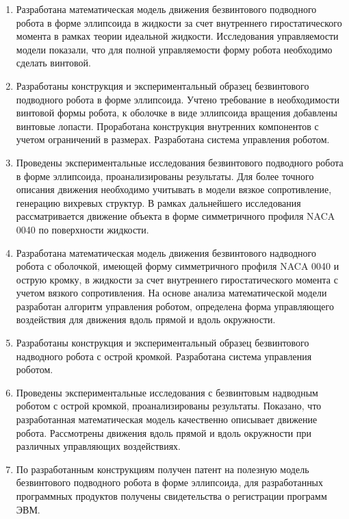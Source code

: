 \begin{enumerate}
  \item Разработана математическая модель движения безвинтового подводного робота в форме эллипсоида в жидкости за счет внутреннего гиростатического момента в рамках теории идеальной жидкости. Исследования управляемости модели показали, что для полной управляемости форму робота необходимо сделать винтовой.
  
  \item Разработаны конструкция и экспериментальный образец безвинтового подводного робота в форме эллипсоида. Учтено требование в необходимости винтовой формы робота, к оболочке в виде эллипсоида вращения добавлены винтовые лопасти. Проработана конструкция внутренних компонентов с учетом ограничений в размерах. Разработана система управления роботом.
  
  \item Проведены экспериментальные исследования безвинтового подводного робота в форме эллипсоида, проанализированы результаты. Для более точного описания движения необходимо учитывать в модели вязкое сопротивление, генерацию вихревых структур. В рамках дальнейшего исследования рассматривается движение объекта в форме симметричного профиля NACA 0040 по поверхности жидкости.
  
  \item Разработана математическая модель движения безвинтового надводного робота с оболочкой, имеющей форму симметричного профиля NACA 0040 и острую кромку, в жидкости за счет внутреннего гиростатического момента с учетом вязкого сопротивления. На основе анализа математической модели разработан алгоритм управления роботом, определена форма управляющего воздействия для движения вдоль прямой и вдоль окружности.
  
  \item Разработаны конструкция и экспериментальный образец безвинтового надводного робота с острой кромкой. Разработана система управления роботом.
  
  \item Проведены экспериментальные исследования с безвинтовым надводным роботом с острой кромкой, проанализированы результаты. Показано, что разработанная математическая модель качественно описывает движение робота. Рассмотрены движения вдоль прямой и вдоль окружности при различных управляющих воздействиях.
  
  \item По разработанным конструкциям получен патент на полезную модель безвинтового подводного робота в форме эллипсоида, для разработанных программных продуктов получены свидетельства о регистрации программ ЭВМ.
\end{enumerate}
